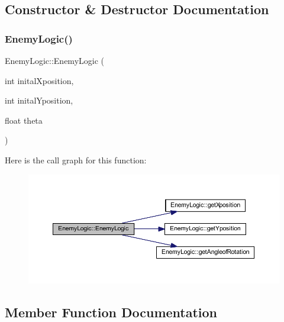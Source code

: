 \subsection{Constructor \& Destructor Documentation}
\mbox{\label{class_enemy_logic_a6b405895fa7556810b8002b0d276d6cc}} 
\subsubsection{\texorpdfstring{Enemy\+Logic()}{EnemyLogic()}}
{\footnotesize\ttfamily Enemy\+Logic\+::\+Enemy\+Logic (\begin{DoxyParamCaption}\item[{int}]{inital\+Xposition,  }\item[{int}]{inital\+Yposition,  }\item[{float}]{theta }\end{DoxyParamCaption})}

Here is the call graph for this function\+:\nopagebreak
\begin{figure}[H]
\begin{center}
\leavevmode
\includegraphics[width=350pt]{class_enemy_logic_a6b405895fa7556810b8002b0d276d6cc_cgraph}
\end{center}
\end{figure}


\subsection{Member Function Documentation}
\mbox{\label{class_enemy_logic_af85aebe59b9cdee37bdab690fa496348}} 
